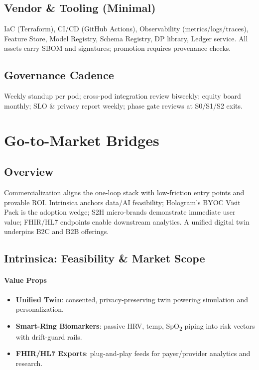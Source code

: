 \documentclass[11pt]{article}
\theoremstyle{plain}
\begin{document}
\subsection{Vendor \& Tooling (Minimal)}
IaC (Terraform), CI/CD (GitHub Actions), Observability (metrics/logs/traces), Feature Store, Model Registry, Schema Registry, DP library, Ledger service. All assets carry SBOM and signatures; promotion requires provenance checks.

\subsection{Governance Cadence}
Weekly standup per pod; cross-pod integration review biweekly; equity board monthly; SLO \& privacy report weekly; phase gate reviews at S0/S1/S2 exits.


\section{Go-to-Market Bridges}

\subsection{Overview}
Commercialization aligns the one-loop stack with low-friction entry points and provable ROI. Intrinsica anchors data/AI feasibility; Hologram's BYOC Visit Pack is the adoption wedge; S2H micro-brands demonstrate immediate user value; FHIR/HL7 endpoints enable downstream analytics. A unified digital twin underpins B2C and B2B offerings.

\subsection{Intrinsica: Feasibility \& Market Scope}
\paragraph{Value Props}
\begin{itemize}
  \item \textbf{Unified Twin}: consented, privacy-preserving twin powering simulation and personalization.
  \item \textbf{Smart-Ring Biomarkers}: passive HRV, temp, SpO\textsubscript{2} piping into risk vectors with drift-guard rails.
  \item \textbf{FHIR/HL7 Exports}: plug-and-play feeds for payer/provider analytics and research.
\end{itemize}
\end{document}
